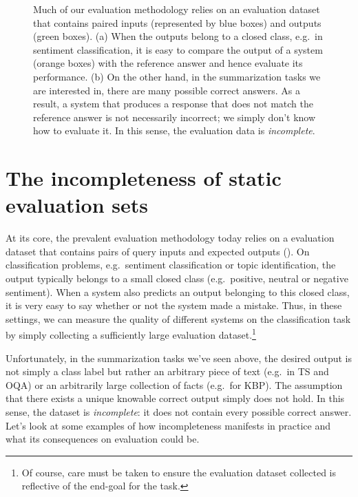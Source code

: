 \begin{figure}
  \caption[Complete and incomplete evaluation sets]{\label{fig:intro:evaluation-data} 
  Much of our evaluation methodology relies on an evaluation dataset that contains paired inputs (represented by blue boxes) and outputs (green boxes).
  (a) When the outputs belong to a closed class, e.g.\ in sentiment classification, it is easy to compare the output of a system (orange boxes) with the reference answer and hence evaluate its performance.
  (b) On the other hand, in the summarization tasks we are interested in, there are many possible correct answers. As a result, a system that produces a response that does not match the reference answer is not necessarily incorrect; we simply don't know how to evaluate it. In this sense, the evaluation data is \textit{incomplete}.
  }
\end{figure}
\section{The incompleteness of static evaluation sets}
At its core, the prevalent evaluation methodology today relies on a evaluation dataset that contains pairs of query inputs and expected outputs ().
On classification problems, e.g.\ sentiment classification or topic identification, the output typically belongs to a small closed class (e.g.\ positive, neutral or negative sentiment).
When a system also predicts an output belonging to this closed class, it is very easy to say whether or not the system made a mistake.
Thus, in these settings, we can measure the quality of different systems on the classification task by simply collecting a sufficiently large evaluation dataset.\footnote{%
Of course, care must be taken to ensure the evaluation dataset collected is reflective of the end-goal for the task.}

Unfortunately, in the summarization tasks we've seen above, the desired output is not simply a class label but rather an arbitrary piece of text (e.g.\ in TS and OQA) or an arbitrarily large collection of facts (e.g.\ for KBP).
The assumption that there exists a unique knowable correct output simply does not hold.
In this sense, the dataset is \textit{incomplete}: it does not contain every possible correct answer.
Let's look at some examples of how incompleteness manifests in practice and what its consequences on evaluation could be.

